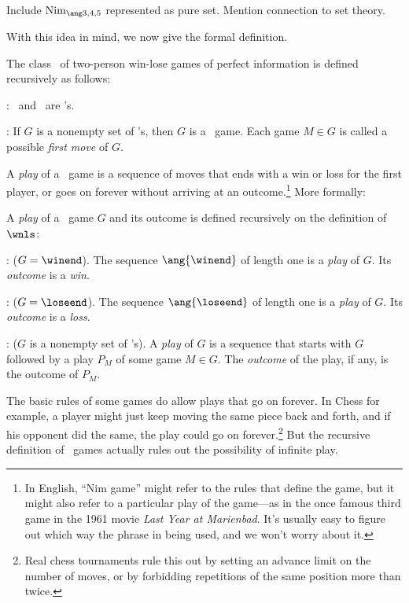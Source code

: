 \begin{definition}
\begin{editingnotes}
Include $\nimg{3,4,5}$ represented as pure set.  Mention connection to
set theory.
\end{editingnotes}

With this idea in mind, we now give the formal definition.

\begin{definition}
The class \wnls\ of two-person win-lose games of perfect information
is defined recursively as follows:

: \winend\ and \loseend\ are \wnls's.

: If $G$ is a nonempty set of \wnls's,
then $G$ is a \wnls\ game.  Each game $M \in G$ is called a possible
\emph{first move} of $G$.
\end{definition}

A \emph{play} of a \wnls\ game is a sequence of moves that ends with a
win or loss for the first player, or goes on forever without arriving
at an outcome.\footnote{In English, ``Nim game'' might refer to the
  rules that define the game, but it might also refer to a particular
  play of the game---as in the once famous third game in the 1961
  movie \emph{Last Year at Marienbad}.  It's usually easy to figure
  out which way the phrase in being used, and we won't worry about
  it.}
More formally:
\begin{definition*}%
A \emph{play} of a \wnls\ game $G$ and its outcome is defined
recursively on the definition of $\wnls$:

: ($G = \winend$).  The
sequence $\ang{\winend}$ of length one is a \emph{play} of $G$.  Its \emph{outcome}
is a \emph{win}.

: ($G = \loseend$).  The sequence $\ang{\loseend}$
of length one is a \emph{play} of $G$.  Its \emph{outcome} is a
\emph{loss}.

: ($G$ is a nonempty set of \wnls's).
A \emph{play} of $G$ is a sequence that starts with $G$ followed by a
play $P_M$ of some game $M \in G$.  The \emph{outcome} of the play, if
any, is the outcome of $P_M$.
\end{definition*}

The basic rules of some games do allow plays that go on forever.  In
Chess for example, a player might just keep moving the same piece back
and forth, and if his opponent did the same, the play could go on
forever.\footnote{Real chess tournaments rule this out by setting an
  advance limit on the number of moves, or by forbidding repetitions
  of the same position more than twice.}  But the recursive definition
of \wnls\ games actually rules out the possibility of infinite play.


\end{definition}
